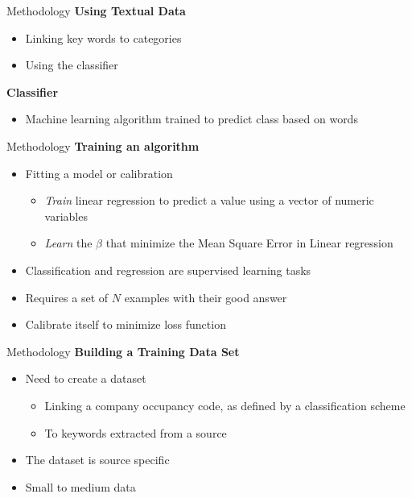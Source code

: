 \begin{frame}[label=metho]{Methodology}
	\textbf{Using Textual Data}
	\begin{itemize}
		\item Linking key words to categories 
		\item Using the classifier
	\end{itemize}	
	
	\textbf{Classifier}
	\begin{itemize}
		\item Machine learning algorithm trained to predict class based on words
	\end{itemize}	
	
\end{frame}


\begin{frame}[label=metho]{Methodology}
	\textbf{Training an algorithm}
	\begin{itemize}
			\item Fitting a model or calibration
		\begin{itemize}
		\item \textit{Train} linear regression to predict a value using a vector of numeric variables
		\item \textit{Learn} the $\beta$ that minimize the Mean Square Error in Linear regression
			\end{itemize}	
		\item Classification and regression are supervised learning tasks
		\item Requires a set of $N$ examples with their good answer
		\item Calibrate itself to minimize loss function
	\end{itemize}	
	
\end{frame}


\begin{frame}[label=metho]{Methodology}
	\textbf{Building a Training Data Set}
	\begin{itemize}
		\item Need to create a dataset 
		\begin{itemize}
			\item Linking a company occupancy code, as defined by a classification scheme
			\item To keywords extracted from a source
		\end{itemize}	
		\item The dataset is source specific
		\item Small to medium data
	
	\end{itemize}	
\end{frame}


